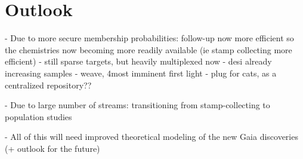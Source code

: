\documentclass[final,5p,times,twocolumn,authoryear]{elsarticle}
\begin{document}
\section{Outlook}
\label{sec:outlook}
- Due to more secure membership probabilities: follow-up now more efficient so the chemistries now becoming more readily available (ie stamp collecting more efficient)
- still sparse targets, but heavily multiplexed now
- desi already increasing samples
- weave, 4most imminent first light
- plug for cats, as a centralized repository??

- Due to large number of streams: transitioning from stamp-collecting to population studies

- All of this will need improved theoretical modeling of the new Gaia discoveries (+ outlook for the future)






\end{document}
